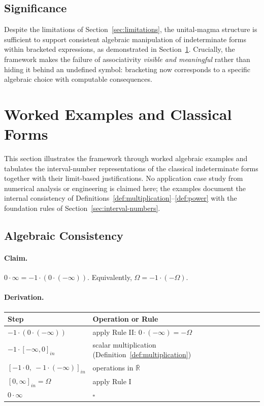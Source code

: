 \documentclass[11pt,a4paper]{article}
\theoremstyle{paperdef}
\newcommand{\Rext}{\overline{\mathbb{R}}}
\newcommand{\inI}[1]{[#1]_{in}}
\begin{document}
\subsection{Significance}

Despite the limitations of Section~\ref{sec:limitations}, the
unital-magma structure is sufficient to support consistent algebraic
manipulation of indeterminate forms within bracketed expressions, as
demonstrated in Section~\ref{sec:applications}. Crucially, the
framework makes the failure of associativity \emph{visible and
meaningful} rather than hiding it behind an undefined symbol:
bracketing now corresponds to a specific algebraic choice with
computable consequences.

\section{Worked Examples and Classical Forms}\label{sec:applications}

This section illustrates the framework through worked algebraic
examples and tabulates the interval-number representations of the
classical indeterminate forms together with their limit-based
justifications. No application case study from numerical analysis or
engineering is claimed here; the examples document the internal
consistency of Definitions~\ref{def:multiplication}--\ref{def:power}
with the foundation rules of Section~\ref{sec:interval-numbers}.

\subsection{Algebraic Consistency}\label{sec:algebraic-consistency}

\paragraph{Claim.}
$0 \cdot \infty = -1 \cdot (0 \cdot (-\infty))$. Equivalently,
$\Omega = -1 \cdot (-\Omega)$.

\paragraph{Derivation.}
\begin{center}
\begin{tabular}{@{}ll@{}}
\toprule
Step & Operation or Rule \\
\midrule
$-1 \cdot (0 \cdot (-\infty))$ & apply Rule II:
  $0 \cdot (-\infty) = -\Omega$ \\
$-1 \cdot \inI{-\infty, 0}$ & scalar multiplication
  (Definition~\ref{def:multiplication}) \\
$\inI{-1 \cdot 0,\ -1 \cdot (-\infty)}$ & operations in $\Rext$ \\
$\inI{0, \infty} = \Omega$ & apply Rule I \\
$0 \cdot \infty$ & $\square$ \\
\bottomrule
\end{tabular}
\end{center}
\end{document}

